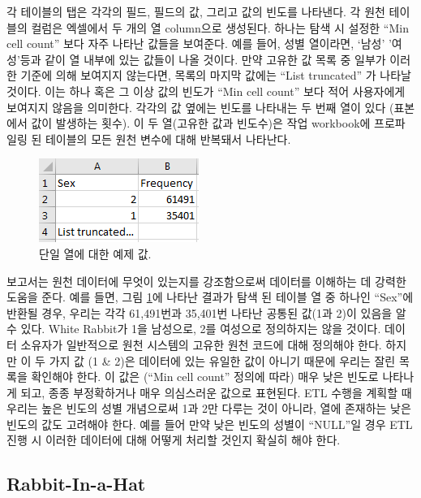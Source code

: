 \documentclass[10.5pt]{book}
\theoremstyle{definition}
\theoremstyle{definition}
\theoremstyle{definition}
\theoremstyle{remark}
\begin{document}
각 테이블의 탭은 각각의 필드, 필드의 값, 그리고 값의 빈도를 나타낸다. 각
원천 테이블의 컬럼은 엑셀에서 두 개의 열 column으로 생성된다. 하나는
탐색 시 설정한 ``Min cell count'' 보다 자주 나타난 값들을 보여준다. 예를
들어, 성별 열이라면, `남성' '여성'등과 같이 열 내부에 있는 값들이 나올
것이다. 만약 고유한 값 목록 중 일부가 이러한 기준에 의해 보여지지
않는다면, 목록의 마지막 값에는 ``List truncated'' 가 나타날 것이다. 이는
하나 혹은 그 이상 값의 빈도가 ``Min cell count'' 보다 적어 사용자에게
보여지지 않음을 의미한다. 각각의 값 옆에는 빈도를 나타내는 두 번째 열이
있다 (표본에서 값이 발생하는 횟수). 이 두 열(고유한 값과 빈도수)은 작업
workbook에 프로파일링 된 테이블의 모든 원천 변수에 대해 반복돼서
나타난다.

\begin{figure}

{\centering \includegraphics[width=0.3\linewidth]{images/ExtractTransformLoad/ScanSex} 

}

\caption{단일 열에 대한 예제 값.}\label{fig:scanSex}
\end{figure}

보고서는 원천 데이터에 무엇이 있는지를 강조함으로써 데이터를 이해하는 데
강력한 도움을 준다. 예를 들면, 그림 \ref{fig:scanSex}에 나타난 결과가
탐색 된 테이블 열 중 하나인 ``Sex''에 반환될 경우, 우리는 각각
61,491번과 35,401번 나타난 공통된 값(1과 2)이 있음을 알 수 있다. White
Rabbit가 1을 남성으로, 2를 여성으로 정의하지는 않을 것이다. 데이터
소유자가 일반적으로 원천 시스템의 고유한 원천 코드에 대해 정의해야 한다.
하지만 이 두 가지 값 (1 \& 2)은 데이터에 있는 유일한 값이 아니기 때문에
우리는 잘린 목록을 확인해야 한다. 이 값은 (``Min cell count'' 정의에
따라) 매우 낮은 빈도로 나타나게 되고, 종종 부정확하거나 매우 의심스러운
값으로 표현된다. ETL 수행을 계획할 때 우리는 높은 빈도의 성별 개념으로써
1과 2만 다루는 것이 아니라, 열에 존재하는 낮은 빈도의 값도 고려해야
한다. 예를 들어 만약 낮은 빈도의 성별이 ``NULL''일 경우 ETL 진행 시
이러한 데이터에 대해 어떻게 처리할 것인지 확실히 해야 한다.

\subsection{Rabbit-In-a-Hat}\label{rabbit-in-a-hat}
\end{document}
